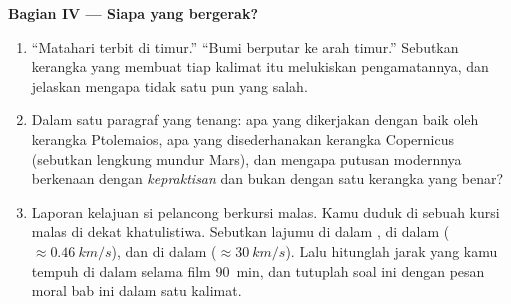 \begin{problem}
\medskip
\noindent\textbf{Bagian IV --- Siapa yang bergerak?}
\begin{enumerate}[resume]
  \item ``Matahari terbit di timur.'' ``Bumi berputar ke arah timur.''
        Sebutkan kerangka yang membuat tiap kalimat itu melukiskan
        pengamatannya, dan jelaskan mengapa tidak satu pun yang salah.
  \item Dalam satu paragraf yang tenang: apa yang dikerjakan dengan
        baik oleh kerangka Ptolemaios, apa yang disederhanakan kerangka
        Copernicus (sebutkan lengkung mundur Mars), dan mengapa putusan
        modernnya berkenaan dengan \emph{kepraktisan} dan bukan dengan
        satu kerangka yang benar?
  \item Laporan kelajuan si pelancong berkursi malas. Kamu duduk 
        di sebuah kursi malas di dekat khatulistiwa. Sebutkan lajumu di
        dalam , di dalam 
        ($\approx \qty{0.46}{km/s}$), dan di dalam  ($\approx \qty{30}{km/s}$). Lalu hitunglah jarak
        yang kamu tempuh di dalam  selama film
        \qty{90}{min}, dan tutuplah soal ini dengan pesan moral bab ini
        dalam satu kalimat.
\end{enumerate}
\end{problem}
